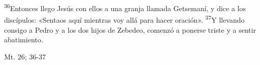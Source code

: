 \documentclass[../../rosario.tex]{subfiles}
\begin{document}
    \textsuperscript{36}Entonces llego Jesús con ellos a una granja llamada Getsemaní, y dice a los discípulos: «Sentaos aquí mientras voy allá para hacer oración». 
    \textsuperscript{37}Y llevando consigo a Pedro y a los dos hijos de Zebedeo, comenzó a ponerse triste y a sentir abatimiento.
    \begin{flushright}
    Mt. 26; 36-37     
    \end{flushright}
\end{document}
